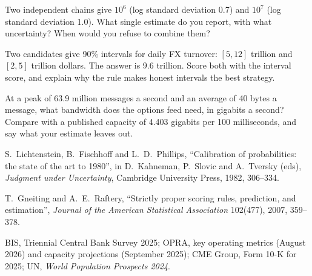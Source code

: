 \begin{interviewq}\label{iq:iv:estimation:11}
Two independent chains give $10^6$ (log standard deviation 0.7) and $10^7$ (log standard deviation 1.0). What
single estimate do you report, with what uncertainty? When would you refuse to combine them?
\end{interviewq}

\begin{interviewq}\label{iq:iv:estimation:12}
Two candidates give 90\% intervals for daily FX turnover: $[5, 12]$ trillion and $[2, 5]$ trillion dollars. The
answer is 9.6 trillion. Score both with the interval score, and explain why the rule makes honest intervals
the best strategy.
\end{interviewq}

\begin{interviewq}\label{iq:iv:estimation:13}
At a peak of 63.9 million messages a second and an average of 40 bytes a message, what bandwidth does the
options feed need, in gigabits a second? Compare with a published capacity of 4.403 gigabits per 100
milliseconds, and say what your estimate leaves out.
\end{interviewq}

\begin{omsources}
\item S.~Lichtenstein, B.~Fischhoff and L.~D.~Phillips, ``Calibration of probabilities: the state of the art to
1980'', in D.~Kahneman, P.~Slovic and A.~Tversky (eds), \emph{Judgment under Uncertainty}, Cambridge University
Press, 1982, 306--334.
\item T.~Gneiting and A.~E.~Raftery, ``Strictly proper scoring rules, prediction, and estimation'',
\emph{Journal of the American Statistical Association} 102(477), 2007, 359--378.
\item BIS, Triennial Central Bank Survey 2025; OPRA, key operating metrics (August 2026) and capacity
projections (September 2025); CME Group, Form 10-K for 2025; UN, \emph{World Population Prospects 2024}.
\end{omsources}
